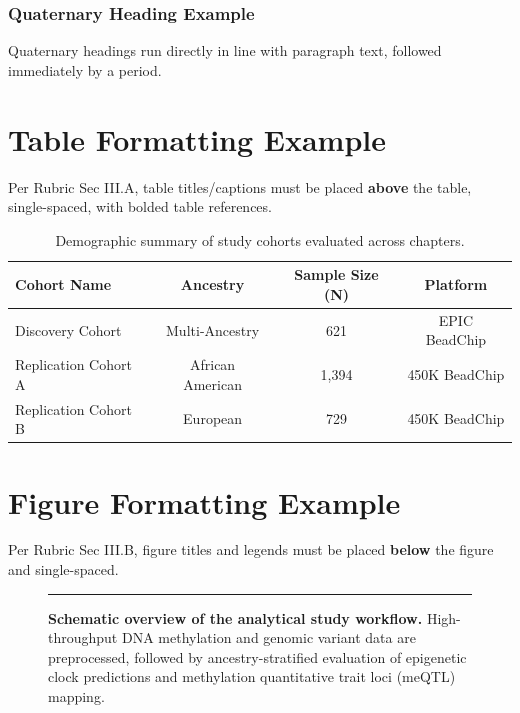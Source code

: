 \subsubsection{Quaternary Heading Example}
Quaternary headings run directly in line with paragraph text, followed immediately by a period.

\section{Table Formatting Example}
Per Rubric Sec III.A, table titles/captions must be placed \textbf{above} the table, single-spaced, with bolded table references.

\begin{table}[htbp]
  \centering
  \caption[Sample demographic summary table.]{Demographic summary of study cohorts evaluated across chapters.}
  \label{tab:demographics}
  \begin{tabular}{lccc}
    \toprule
    \textbf{Cohort Name} & \textbf{Ancestry} & \textbf{Sample Size (N)} & \textbf{Platform} \\
    \midrule
    Discovery Cohort     & Multi-Ancestry    & 621                      & EPIC BeadChip \\
    Replication Cohort A & African American  & 1,394                    & 450K BeadChip \\
    Replication Cohort B & European          & 729                      & 450K BeadChip \\
    \bottomrule
  \end{tabular}
\end{table}

\section{Figure Formatting Example}
Per Rubric Sec III.B, figure titles and legends must be placed \textbf{below} the figure and single-spaced.

\begin{figure}[htbp]
  \centering
  \rule{0.8\linewidth}{2in} %
  \caption[Schematic overview of the analytical study workflow.]{
    \textbf{Schematic overview of the analytical study workflow.}
    High-throughput DNA methylation and genomic variant data are preprocessed, followed by ancestry-stratified evaluation of epigenetic clock predictions and methylation quantitative trait loci (meQTL) mapping.
  }
  \label{fig:workflow}
\end{figure}

